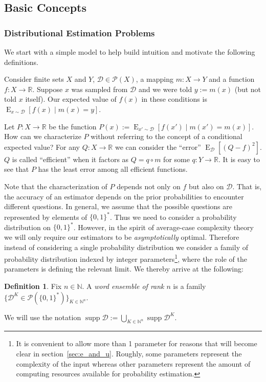 \documentclass{article}
\numberwithin{equation}{section}
\theoremstyle{definition}
\newtheorem{definition}{Definition}[section]
\theoremstyle{plain}
\newcommand{\Bool}{\{0,1\}}
\newcommand{\Words}{{\Bool^*}}
\DeclareMathOperator{\Supp}{supp}
\DeclareMathOperator{\E}{E}
\newcommand{\Nats}{\mathbb{N}}
\newcommand{\Reals}{\mathbb{R}}
\newcommand{\Dist}{\mathcal{D}}
\begin{document}
\subsection{Basic Concepts}

\subsubsection{Distributional Estimation Problems}

We start with a simple model to help build intuition and motivate the following definitions.

Consider finite sets $X$ and $Y$, $\Dist \in \mathcal{P}(X)$, a mapping $m: X \rightarrow Y$ and a function $f: X \rightarrow \Reals$. Suppose $x$ was sampled from $\Dist$ and we were told $y := m(x)$ (but not told $x$ itself). Our expected value of $f(x)$ in these conditions is ${\E_{x \sim \Dist}[f(x) \mid m(x) = y]}$.

Let $P: X \rightarrow \Reals$ be the function $P(x) := \E_{x' \sim \Dist}[f(x') \mid m(x') = m(x)]$. How can we characterize $P$ without referring to the concept of a conditional expected value? For any $Q: X \rightarrow \Reals$ we can consider the \enquote{error} $\E_\Dist[(Q - f)^2]$. $Q$ is called \enquote{efficient} when it factors as $Q = q \circ m$ for some $q: Y \rightarrow \Reals$. It is easy to see that $P$ has the least error among all efficient functions.

Note that the characterization of $P$ depends not only on $f$ but also on $\Dist$. That is, the accuracy of an estimator depends on the prior probabilities to encounter different questions. In general, we assume that the possible questions are represented by elements of $\Words$. Thus we need to consider a probability distribution on $\Words$. However, in the spirit of average-case complexity theory we will only require our estimators to be \emph{asymptotically} optimal. Therefore instead of considering a single probability distribution we consider a family of probability distribution indexed by integer parameters\footnote{It is convenient to allow more than 1 parameter for reasons that will become clear in section~\ref{sec:e_and_u}. Roughly, some parameters represent the complexity of the input whereas other parameters represent the amount of computing resources available for probability estimation.}, where the role of the parameters is defining the relevant limit. We thereby arrive at the following:

\begin{definition}

Fix ${n \in \Nats}$. A \emph{word ensemble of rank ${n}$} is a family ${\{\Dist^{K} \in \mathcal{P}(\Words)\}_{K \in \Nats^n}}$.

We will use the notation $\Supp \Dist := \bigcup_{K \in \Nats^n} \Supp \Dist^K$.

\end{definition}
\end{document}
